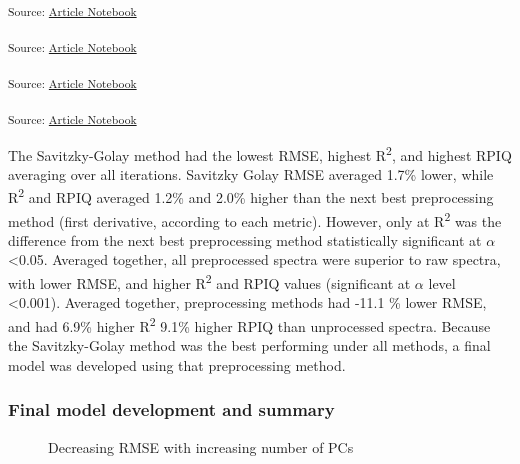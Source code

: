 \documentclass[
]{agujournal2019}
\begin{document}
\textsubscript{Source:
\href{https://rvcrawford.github.io/glowing-system/index.qmd.html}{Article
Notebook}}

\textsubscript{Source:
\href{https://rvcrawford.github.io/glowing-system/index.qmd.html}{Article
Notebook}}

\textsubscript{Source:
\href{https://rvcrawford.github.io/glowing-system/index.qmd.html}{Article
Notebook}}

\textsubscript{Source:
\href{https://rvcrawford.github.io/glowing-system/index.qmd.html}{Article
Notebook}}

The Savitzky-Golay method had the lowest RMSE, highest
R\textsuperscript{2}, and highest RPIQ averaging over all iterations.
Savitzky Golay RMSE averaged 1.7\% lower, while R\textsuperscript{2} and
RPIQ averaged 1.2\% and 2.0\% higher than the next best preprocessing
method (first derivative, according to each metric). However, only at
R\textsuperscript{2} was the difference from the next best preprocessing
method statistically significant at \(\alpha\) \textless0.05. Averaged
together, all preprocessed spectra were superior to raw spectra, with
lower RMSE, and higher R\textsuperscript{2} and RPIQ values (significant
at \(\alpha\) level \textless0.001). Averaged together, preprocessing
methods had -11.1 \% lower RMSE, and had 6.9\% higher
R\textsuperscript{2} 9.1\% higher RPIQ than unprocessed spectra. Because
the Savitzky-Golay method was the best performing under all methods, a
final model was developed using that preprocessing method.

\subsubsection{Final model development and
summary}\label{final-model-development-and-summary}

\label{cell-fig-model-calibration}
\begin{figure}[H]


\caption{\label{fig-model-calibration}Decreasing RMSE with increasing
number of PCs}

\end{figure}%
\end{document}
